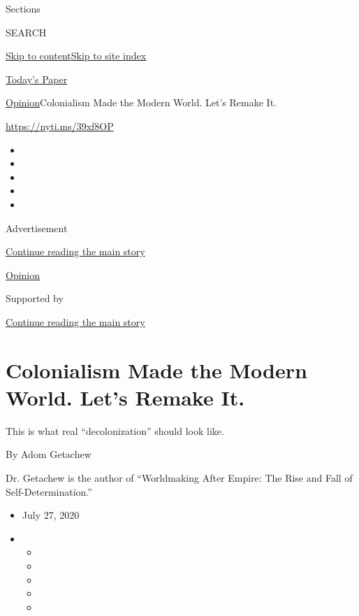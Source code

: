 Sections

SEARCH

\protect\hyperlink{site-content}{Skip to
content}\protect\hyperlink{site-index}{Skip to site index}

\href{https://myaccount.nytimes3xbfgragh.onion/auth/login?response_type=cookie\&client_id=vi}{}

\href{https://www.nytimes3xbfgragh.onion/section/todayspaper}{Today's
Paper}

\href{/section/opinion}{Opinion}\textbar{}Colonialism Made the Modern
World. Let's Remake It.

\url{https://nyti.ms/39xf8OP}

\begin{itemize}
\item
\item
\item
\item
\item
\end{itemize}

Advertisement

\protect\hyperlink{after-top}{Continue reading the main story}

\href{/section/opinion}{Opinion}

Supported by

\protect\hyperlink{after-sponsor}{Continue reading the main story}

\hypertarget{colonialism-made-the-modern-world-lets-remake-it}{%
\section{Colonialism Made the Modern World. Let's Remake
It.}\label{colonialism-made-the-modern-world-lets-remake-it}}

This is what real ``decolonization'' should look like.

By Adom Getachew

Dr. Getachew is the author of ``Worldmaking After Empire: The Rise and
Fall of Self-Determination.''

\begin{itemize}
\item
  July 27, 2020
\item
  \begin{itemize}
  \item
  \item
  \item
  \item
  \item
  \end{itemize}
\end{itemize}

